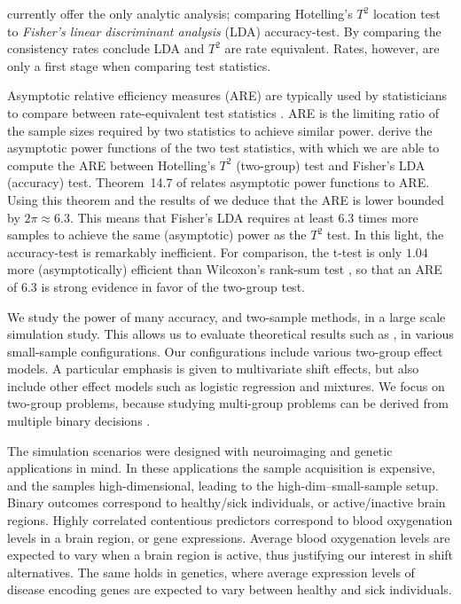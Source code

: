 \documentclass[]{bio}
\begin{document}
\cite{ramdas_classification_2016} currently offer the only analytic analysis; comparing Hotelling's $T^2$ location test to \emph{Fisher's linear discriminant analysis} (LDA) accuracy-test. 
By comparing the consistency rates \cite{ramdas_classification_2016} conclude LDA and $T^2$ are rate equivalent.
Rates, however, are only a first stage when comparing test statistics. 

Asymptotic relative efficiency measures (ARE) are typically used by statisticians to compare between rate-equivalent test statistics \citep{vaart_asymptotic_1998}.
ARE is the limiting ratio of the sample sizes required by two statistics to achieve similar power. 
\citet{ramdas_classification_2016} derive the asymptotic power functions of the two test statistics, with which we are able to compute the ARE between Hotelling's $T^2$ (two-group) test and Fisher's LDA (accuracy) test.
Theorem~14.7 of \cite{vaart_asymptotic_1998} relates asymptotic power functions to ARE.
Using this theorem and the results of \cite{ramdas_classification_2016} we deduce that the ARE is lower bounded by $2 \pi \approx 6.3$.
This means that Fisher's LDA requires at least $6.3$ times more samples to achieve the same (asymptotic) power as the $T^2$ test. 
In this light, the accuracy-test is remarkably inefficient.  
For comparison, the t-test is only $1.04$ more (asymptotically) efficient than Wilcoxon's rank-sum test \citep{lehmann_parametric_2009}, so that an ARE of $6.3$ is strong evidence in favor of the two-group test. 

We study the power of many accuracy, and two-sample methods, in a large scale simulation study. 
This allows us to evaluate theoretical results such as \citet{ramdas_classification_2016}, in various small-sample configurations.
Our configurations include various two-group effect models. 
A particular emphasis is given to multivariate shift effects, but also include other effect models such as logistic regression and  mixtures. 
We focus on two-group problems, because studying multi-group problems can be derived from multiple binary decisions \citep{zheng2018extrapolating}.

The simulation scenarios were designed with neuroimaging and genetic applications in mind. 
In these applications the sample acquisition is expensive, and the samples high-dimensional, leading to the high-dim--small-sample setup.
Binary outcomes correspond to healthy/sick individuals, or active/inactive brain regions.
Highly correlated contentious predictors correspond to blood oxygenation levels in a brain region, or gene expressions.
Average blood oxygenation levels are expected to vary when a brain region is active, thus justifying our interest in shift alternatives. 
The same holds in genetics, where average expression levels of disease encoding genes are expected to vary between healthy and sick individuals. 
\end{document}

